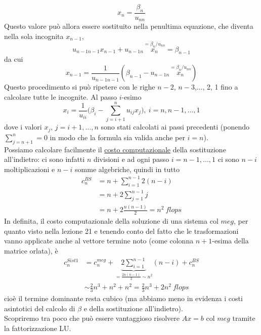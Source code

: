 \documentclass[12pt,a4paper]{article}
\begin{document}
\begin{equation*}
    x_n = \frac{\beta_n}{u_{nn}}
\end{equation*}
Questo valore può allora essere sostituito nella penultima equazione, che diventa nella sola incognita $x_{n-1}$,
\[
u_{n-1n-1}x_{n-1}+u_{n-1n}\overset{=\beta_n/u_{nn}}{x_n}=\beta_{n-1}
\]
da cui 
\[x_{n-1}=\frac{1}{u_{n-1n-1}}(\beta_{n-1}-u_{n-1n}\overset{=\beta_n/u_{nn}}{x_n})
\]
Questo procedimento si può ripetere con le righe $n-2$, $n-3$,..., 2, 1 fino a calcolare tutte le incognite. Al passo $i$-esimo
\begin{equation*}
    x_i = \frac{1}{u_{ii}} \biggl( \beta_i - \sum_{j=i+1}^n u_{ij}x_j \biggr), \ i=n,n-1,\dots,1
\end{equation*}
dove i valori $x_j$, $j=i+1,...,n$ sono stati calcolati ai passi precedenti (ponendo $\sum_{j=n+1}^n = 0$ in modo che la formula sia valida anche per $i=n$). \\
Possiamo calcolare facilmente il \uline{costo computazionale} della sostituzione all'indietro: ci sono infatti $n$ divisioni e ad ogni passo $i=n-1,...,1$ ci sono $n-i$ moltiplicazioni e $n-i$ somme algebriche, quindi in tutto
\begin{equation*}
    \begin{split}
        c_n^{BS} & = n + \sum_{i=1}^{n-1} 2(n-i) \\
                 & = n + 2\sum_{j=1}^{n-1} j \\
                 & = n + 2\frac{n(n-1)}{2} = n^2 \ flops
    \end{split}
\end{equation*}
In definita, il costo computazionale della soluzione di una sistema col $meg$, per quanto visto nella lezione 21 e tenendo conto del fatto che le trasformazioni vanno applicate anche al vettore termine noto (come colonna $n+1$-esima della matrice orlata), è 
\begin{equation*}
    \begin{split}
        c_n^{Sist1} & = c_n^{meg} + \underbrace{2\sum_{i=1}^{n-1}}_{=\frac{2n(n-1)}{2}\sim n^2} (n-i) + c_n^{BS} \\
        & \sim \frac{2}{3}n^3 + n^2 + n^2 = \frac{2}{3}n^3 + 2n^2 \ flops
    \end{split}
\end{equation*}
cioè il termine dominante resta cubico (ma abbiamo meno in evidenza i costi asintotici del calcolo di $\beta$ e della sostituzione all'indietro). \\
Scopriremo tra poco che può essere vantaggioso risolvere $Ax=b$ col $meg$ tramite la fattorizzazione LU.
\end{document}
